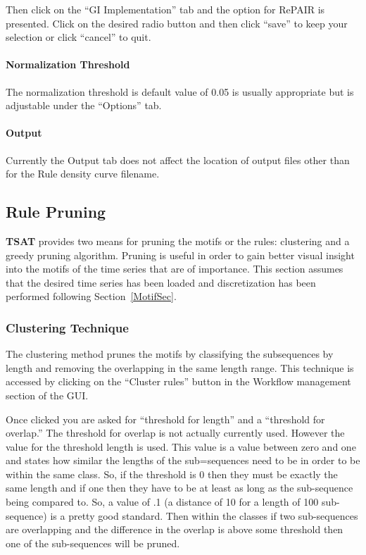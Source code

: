 \documentclass[titlepage, letterpaper, 12pt]{article}
\newcommand\TSAT{\textbf{TSAT}}
\begin{document}
Then click on the ``GI Implementation'' tab and the option for RePAIR is presented.  Click on the desired radio button and then click ``save'' to keep your selection or click ``cancel'' to quit.

\paragraph{Normalization Threshold}
The normalization threshold is default value of 0.05 is usually appropriate but is adjustable under the ``Options'' tab.

\paragraph{Output}
Currently the Output tab does not affect the location of output files other than for the Rule density curve filename. 


\subsection{Rule Pruning}

{\TSAT} provides two means for pruning the motifs or the rules: clustering and a greedy pruning algorithm.  Pruning is useful in order to gain better visual insight into the motifs of the time series that are of importance.  This section assumes that the desired time series has been loaded and discretization has been performed following Section~\ref{MotifSec}.

\subsubsection{Clustering Technique}

The clustering method prunes the motifs by classifying the subsequences by length and removing the overlapping in the same length range. This technique is accessed by clicking on the ``Cluster rules'' button in the Workflow management section of the GUI.

Once clicked you are asked for ``threshold for length'' and a ``threshold for overlap.''  The threshold for overlap is not actually currently used. However the value for the threshold length is used. This value is a value between zero and one and states how similar the lengths of the sub=sequences need to be in order to be within the same class.  So, if the threshold is 0 then they must be exactly the same length and if one then they have to be at least as long as the sub-sequence being compared to.  So, a value of .1 (a distance of 10 for a length of 100 sub-sequence) is a pretty good standard.  Then within the classes if two sub-sequences are overlapping and the difference in the overlap is above some threshold then one of the sub-sequences will be pruned.
\end{document}
